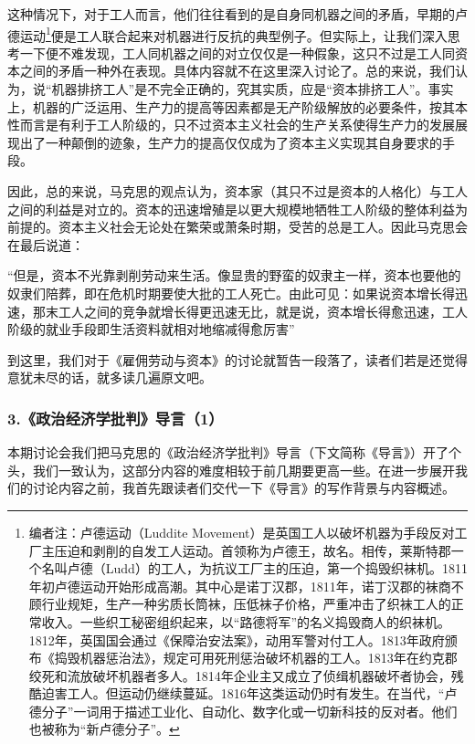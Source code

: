 \documentclass[a4paper,twoside,12pt,AutoFakeBold]{ctexart}
\begin{document}
这种情况下，对于工人而言，他们往往看到的是自身同机器之间的矛盾，早期的卢德运动\footnote{编者注：卢德运动（Luddite Movement）是英国工人以破坏机器为手段反对工厂主压迫和剥削的自发工人运动。首领称为卢德王，故名。相传，莱斯特郡一个名叫卢德（Ludd）的工人，为抗议工厂主的压迫，第一个捣毁织袜机。1811年初卢德运动开始形成高潮。其中心是诺丁汉郡，1811年，诺丁汉郡的袜商不顾行业规矩，生产一种劣质长筒袜，压低袜子价格，严重冲击了织袜工人的正常收入。一些织工秘密组织起来，以“路德将军”的名义捣毁商人的织袜机。1812年，英国国会通过《保障治安法案》，动用军警对付工人。1813年政府颁布《捣毁机器惩治法》，规定可用死刑惩治破坏机器的工人。1813年在约克郡绞死和流放破坏机器者多人。1814年企业主又成立了侦缉机器破坏者协会，残酷迫害工人。但运动仍继续蔓延。1816年这类运动仍时有发生。在当代，“卢德分子”一词用于描述工业化、自动化、数字化或一切新科技的反对者。他们也被称为“新卢德分子”。}便是工人联合起来对机器进行反抗的典型例子。但实际上，让我们深入思考一下便不难发现，工人同机器之间的对立仅仅是一种假象，这只不过是工人同资本之间的矛盾一种外在表现。具体内容就不在这里深入讨论了。总的来说，我们认为，说“机器排挤工人”是不完全正确的，究其实质，应是“资本排挤工人”。事实上，机器的广泛运用、生产力的提高等因素都是无产阶级解放的必要条件，按其本性而言是有利于工人阶级的，只不过资本主义社会的生产关系使得生产力的发展展现出了一种颠倒的迹象，生产力的提高仅仅成为了资本主义实现其自身要求的手段。

因此，总的来说，马克思的观点认为，资本家（其只不过是资本的人格化）与工人之间的利益是对立的。资本的迅速增殖是以更大规模地牺牲工人阶级的整体利益为前提的。资本主义社会无论处在繁荣或萧条时期，受苦的总是工人。因此马克思会在最后说道：
\begin{adjustwidth}{2em}{2em}
    \qquad\fangsong
    “但是，资本不光靠剥削劳动来生活。像显贵的野蛮的奴隶主一样，资本也要他的奴隶们陪葬，即在危机时期要使大批的工人死亡。由此可见：如果说资本增长得迅速，那末工人之间的竞争就增长得更迅速无比，就是说，资本增长得愈迅速，工人阶级的就业手段即生活资料就相对地缩减得愈厉害”
\end{adjustwidth}
\vspace{0.4cm}
到这里，我们对于《雇佣劳动与资本》的讨论就暂告一段落了，读者们若是还觉得意犹未尽的话，就多读几遍原文吧。

\subsubsection{3.《政治经济学批判》导言（1）}
本期讨论会我们把马克思的《政治经济学批判》导言（下文简称《导言》）开了个头，我们一致认为，这部分内容的难度相较于前几期要更高一些。在进一步展开我们的讨论内容之前，我首先跟读者们交代一下《导言》的写作背景与内容概述。
\end{document}
